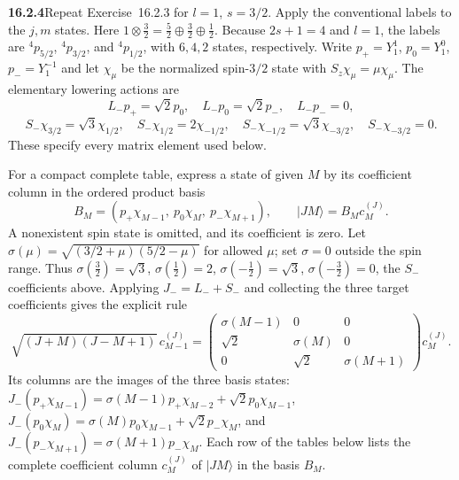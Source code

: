 \par\bigskip
\noindent\textbf{16.2.4}\quad Repeat Exercise~16.2.3 for $l=1$,
$s=3/2$. Apply the conventional labels to the $j,m$ states.
\solution
Here $1\otimes\tfrac32=\tfrac52\oplus\tfrac32\oplus\tfrac12$.
Because $2s+1=4$ and $l=1$, the labels are
\( {}^4p_{5/2}\), \( {}^4p_{3/2}\), and \( {}^4p_{1/2}\),
with $6,4,2$ states, respectively.
Write $p_+=Y_1^1$, $p_0=Y_1^0$, $p_-=Y_1^{-1}$ and let
$\chi_\mu$ be the normalized spin-$3/2$ state with $S_z\chi_\mu=\mu\chi_\mu$.
The elementary lowering actions are
\[
L_-p_+=\sqrt2p_0,\quad L_-p_0=\sqrt2p_-,\quad L_-p_-=0,
\]
\[
S_-\chi_{3/2}=\sqrt3\chi_{1/2},\quad
S_-\chi_{1/2}=2\chi_{-1/2},\quad
S_-\chi_{-1/2}=\sqrt3\chi_{-3/2},\quad S_-\chi_{-3/2}=0.
\]
These specify every matrix element used below.

For a compact complete table, express a state of given $M$ by its
coefficient column in the ordered product basis
\[
B_M=(p_+\chi_{M-1},\ p_0\chi_M,\ p_-\chi_{M+1}),
\qquad |JM\rangle=B_Mc_M^{(J)}.
\]
A nonexistent spin state is omitted, and its coefficient is zero.
Let $\sigma(\mu)=\sqrt{(3/2+\mu)(5/2-\mu)}$ for allowed $\mu$;
set $\sigma=0$ outside the spin range. Thus
$\sigma(\tfrac32)=\sqrt3$, $\sigma(\tfrac12)=2$,
$\sigma(-\tfrac12)=\sqrt3$, $\sigma(-\tfrac32)=0$, the $S_-$
coefficients above. Applying $J_-=L_-+S_-$
and collecting the three target coefficients gives the explicit rule
\[
\sqrt{(J+M)(J-M+1)}\,c_{M-1}^{(J)}
=
\begin{pmatrix}
\sigma(M-1)&0&0\\
\sqrt2&\sigma(M)&0\\
0&\sqrt2&\sigma(M+1)
\end{pmatrix}c_M^{(J)}.
\tag{*}
\]
Its columns are the images of the three basis states:
$J_-(p_+\chi_{M-1})=\sigma(M-1)p_+\chi_{M-2}+\sqrt2p_0\chi_{M-1}$,
$J_-(p_0\chi_M)=\sigma(M)p_0\chi_{M-1}+\sqrt2p_-\chi_M$, and
$J_-(p_-\chi_{M+1})=\sigma(M+1)p_-\chi_M$.
Each row of the tables below lists the complete coefficient column
$c_M^{(J)}$ of $|JM\rangle$ in the basis $B_M$.

